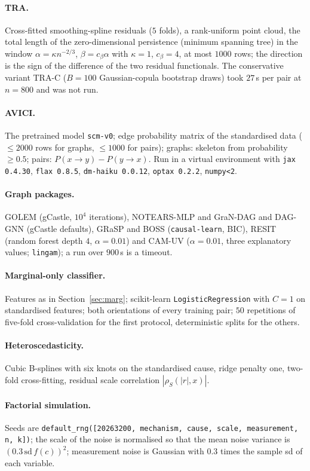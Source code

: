 \paragraph{TRA.} Cross-fitted smoothing-spline residuals ($5$ folds), a rank-uniform point cloud, the total length of the zero-dimensional persistence (minimum spanning tree) in the window $\alpha=\kappa n^{-2/3}$, $\beta=c_\beta\alpha$ with $\kappa=1$, $c_\beta=4$, at most $1000$ rows; the direction is the sign of the difference of the two residual functionals. The conservative variant TRA-C ($B=100$ Gaussian-copula bootstrap draws) took $27$\,s per pair at $n=800$ and was not run.
\paragraph{AVICI.} The pretrained model \texttt{scm-v0}; edge probability matrix of the standardised data ($\le 2000$ rows for graphs, $\le 1000$ for pairs); graphs: skeleton from probability $\ge 0.5$; pairs: $P(x\to y)-P(y\to x)$. Run in a virtual environment with \texttt{jax 0.4.30}, \texttt{flax 0.8.5}, \texttt{dm-haiku 0.0.12}, \texttt{optax 0.2.2}, \texttt{numpy<2}.
\paragraph{Graph packages.} GOLEM (gCastle, $10^4$ iterations), NOTEARS-MLP and GraN-DAG and DAG-GNN (gCastle defaults), GRaSP and BOSS (\texttt{causal-learn}, BIC), RESIT (random forest depth $4$, $\alpha=0.01$) and CAM-UV ($\alpha=0.01$, three explanatory values; \texttt{lingam}); a run over $900$\,s is a timeout.
\paragraph{Marginal-only classifier.} Features as in Section~\ref{sec:marg}; scikit-learn \texttt{LogisticRegression} with $C=1$ on standardised features; both orientations of every training pair; $50$ repetitions of five-fold cross-validation for the first protocol, deterministic splits for the others.
\paragraph{Heteroscedasticity.} Cubic B-splines with six knots on the standardised cause, ridge penalty one, two-fold cross-fitting, residual scale correlation $|\rho_S(|r|,x)|$.
\paragraph{Factorial simulation.} Seeds are \texttt{default\_rng([20263200, mechanism, cause, scale, measurement, n, k])}; the scale of the noise is normalised so that the mean noise variance is $(0.3\,\mathrm{sd}\,f(c))^2$; measurement noise is Gaussian with $0.3$ times the sample sd of each variable.
